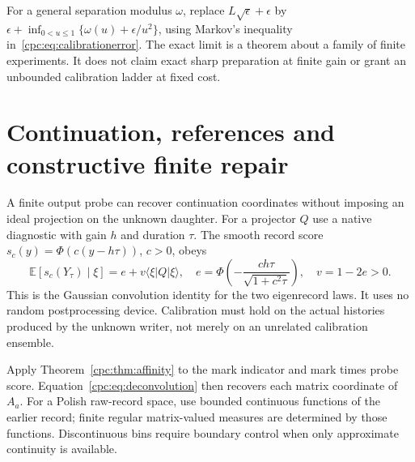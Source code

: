 \documentclass[11pt,oneside,openany]{book}
\theoremstyle{definition}
\theoremstyle{remark}\newtheorem{remark}[theorem]{Remark}
\begin{document}
For a general separation modulus $\omega$, replace $L\sqrt\epsilon+\epsilon$ by
$\epsilon+\inf_{0<u\le1}\{\omega(u)+\epsilon/u^2\}$, using Markov's inequality in~\eqref{cpc:eq:calibrationerror}. The exact limit is a theorem about a family of finite experiments. It does not claim exact sharp preparation at finite gain or grant an unbounded calibration ladder at fixed cost.

\section{Continuation, references and constructive finite repair}

A finite output probe can recover continuation coordinates without imposing an ideal projection on the unknown daughter. For a projector $Q$ use a native diagnostic with gain $h$ and duration $\tau$. The smooth record score $s_c(y)=\Phi(c(y-h\tau))$, $c>0$, obeys
\begin{equation}
 \mathbb E[s_c(Y_\tau)\mid\xi]=e+v\langle\xi|Q|\xi\rangle,\quad
 e=\Phi\!\left(-\frac{ch\tau}{\sqrt{1+c^2\tau}}\right),\quad v=1-2e>0.
 \label{cpc:eq:deconvolution}
\end{equation}
This is the Gaussian convolution identity for the two eigenrecord laws. It uses no random postprocessing device. Calibration must hold on the actual histories produced by the unknown writer, not merely on an unrelated calibration ensemble.

Apply Theorem~\ref{cpc:thm:affinity} to the mark indicator and mark times probe score. Equation~\eqref{cpc:eq:deconvolution} then recovers each matrix coordinate of $A_a$. For a Polish raw-record space, use bounded continuous functions of the earlier record; finite regular matrix-valued measures are determined by those functions. Discontinuous bins require boundary control when only approximate continuity is available.
\end{document}
